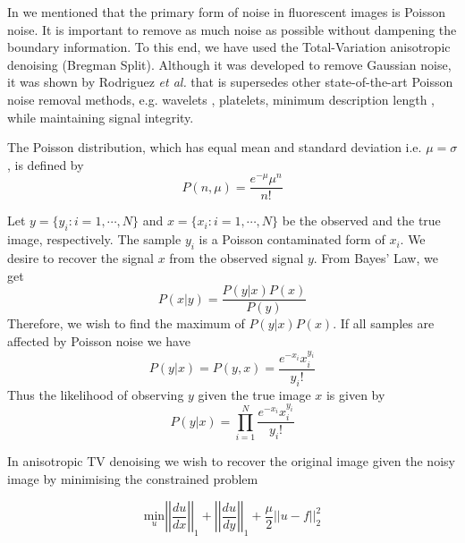 \begin{definition}
	In  we mentioned that the primary form of noise in fluorescent images is Poisson noise. It is important to remove as much noise as possible without dampening the boundary information. To this end, we have used the Total-Variation anisotropic denoising (Bregman Split). Although it was developed to remove Gaussian noise, it was shown by Rodriguez \textit{et al.}\citep{Rodriguez2008} that is supersedes other state-of-the-art Poisson noise removal methods, e.g.  wavelets \citep{Timmermann1999}, platelets\citep{Willett2004}, minimum description length \citep{Nowak1999}, while maintaining signal integrity. 
	
	The Poisson distribution, which has equal mean and standard deviation i.e. $\mu = \sigma$, is defined by
	\begin{equation}
	P(n,\mu) = \frac{e^{-\mu}\mu^{n}}{n!}
	\label{eq:poissondist}
	\end{equation}
	
	Let $y = \lbrace y_i:i=1, \cdots, N \rbrace$ and $x = \lbrace x_i:i=1, \cdots, N \rbrace$ be the observed and the true image, respectively. The sample $y_i$ is a Poisson contaminated form of $x_i$. We desire to recover the signal $x$ from the observed signal $y$. From Bayes' Law, we get
	\begin{equation}
	P(x \vert y) = \frac{P(y \vert x)P(x)}{P(y)}
	\label{eq:bayeslaw}
	\end{equation}
	Therefore, we wish to find the maximum of $P(y \vert x)P(x)$. If all samples are affected by Poisson noise we have
	\begin{equation}
	P(y \vert x) = P(y,x) = \frac{e^{-x_i}x_i^{y_i}}{y_i!}
	\label{eq:poissonafect}
	\end{equation}
	Thus the likelihood of observing $y$ given the true image $x$ is given by
	\begin{equation}
	P(y \vert x) = \prod_{i=1}^{N} \frac{e^{-x_i}x_i^{y_i}}{y_i!}
	\label{eq:poissonlikelihood}
	\end{equation}
	
	In anisotropic TV denoising we wish to recover the original image given the noisy image by minimising the constrained problem
	
	\begin{equation}
	\underset{u} {\mathrm{min}} \left| \left| \frac{du}{dx} \right| \right|_1 + \left| \left| \frac{du}{dy} \right| \right|_1 + \frac{\mu}{2} \left| \left| u-f \right| \right|^2_2
	\label{equ:anisotropic_tv_constrained}
	\end{equation}
	

\end{definition}
